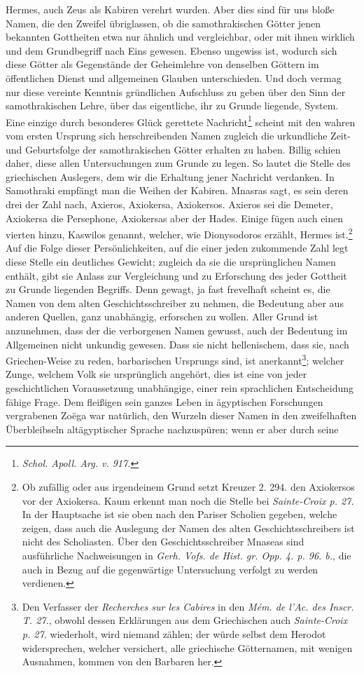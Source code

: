 \documentclass[a4paper, 11pt, oneside]{article}
\begin{document}
Hermes, auch Zeus als Kabiren verehrt wurden. Aber dies sind für uns bloße Namen, die den Zweifel übriglassen, ob die samothrakischen Götter jenen bekannten Gottheiten etwa nur ähnlich und vergleichbar, oder mit ihnen wirklich und dem Grundbegriff nach Eins gewesen. Ebenso ungewiss ist, wodurch sich diese Götter als Gegenstände der Geheimlehre von denselben Göttern im öffentlichen Dienst und allgemeinen Glauben unterschieden. Und doch vermag nur diese vereinte Kenntnis gründlichen Aufschluss zu geben über den Sinn der samothrakischen Lehre, über das eigentliche, ihr zu Grunde liegende, System. Eine einzige durch besonderes Glück gerettete Nachricht\footnote{\emph{Schol. Apoll. Arg. v. 917.}} scheint mit den wahren vom ersten Ursprung sich herschreibenden Namen zugleich die urkundliche Zeit- und Geburtsfolge der samothrakischen Götter erhalten zu haben. Billig schien daher, diese allen Untersuchungen zum Grunde zu legen. So lautet die Stelle des griechischen Auslegers, dem wir die Erhaltung jener Nachricht verdanken. In Samothraki empfängt man die Weihen der Kabiren. Mnasras sagt, es sein deren drei der Zahl nach, Axieros, Axiokersa, Axiokersos. Axieros sei die Demeter, Axiokersa die Persephone, Axiokersas aber der Hades. Einige fügen auch einen vierten hinzu, Kaswilos genannt, welcher, wie Dionysodoros erzählt, Hermes ist.\footnote{Ob zufällig oder aus irgendeinem Grund setzt Kreuzer 2. 294. den Axiokersos vor der Axiokersa. Kaum erkennt man noch die Stelle bei \emph{Sainte-Croix p. 27.} In der Hauptsache ist sie oben nach den Pariser Scholien gegeben, welche zeigen, dass auch die Auslegung der Namen des alten Geschichtsschreibers ist nicht des Scholiasten. Über den Geschichtsschreiber Mnaseas sind ausführliche Nachweisungen in \emph{Gerh. Vofs. de Hist. gr. Opp. 4. p. 96. b.}, die auch in Bezug auf die gegenwärtige Untersuchung verfolgt zu werden verdienen.} Auf die Folge dieser Persönlichkeiten, auf die einer jeden zukommende Zahl legt diese Stelle ein deutliches Gewicht; zugleich da sie die ursprünglichen Namen enthält, gibt sie Anlass zur Vergleichung und zu Erforschung des jeder Gottheit zu Grunde liegenden Begriffs. Denn gewagt, ja fast frevelhaft scheint es, die Namen von dem alten Geschichtsschreiber zu nehmen, die Bedeutung aber aus anderen Quellen, ganz unabhängig, erforschen zu wollen. Aller Grund ist anzunehmen, dass der die verborgenen Namen gewusst, auch der Bedeutung im Allgemeinen nicht unkundig gewesen. Dass sie nicht hellenischem, dass sie, nach Griechen-Weise zu reden, barbarischen Ursprungs sind, ist anerkannt\footnote{Den Verfasser der \emph{Recherches sur les Cabires} in den \emph{Mém. de l'Ac. des Inscr. T. 27.}, obwohl dessen Erklärungen aus dem Griechischen auch \emph{Sainte-Croix p. 27.} wiederholt, wird niemand zählen; der würde selbst dem Herodot widersprechen, welcher versichert, alle griechische Götternamen, mit wenigen Ausnahmen, kommen von den Barbaren her.}; welcher Zunge, welchem Volk sie ursprünglich angehört, dies ist eine von jeder geschichtlichen Voraussetzung unabhängige, einer rein sprachlichen Entscheidung fähige Frage. Dem fleißigen sein ganzes Leben in ägyptischen Forschungen vergrabenen Zoëga war natürlich, den Wurzeln dieser Namen in den zweifelhaften Überbleibseln altägyptischer Sprache nachzuspüren; wenn er aber durch seine 
\end{document}

